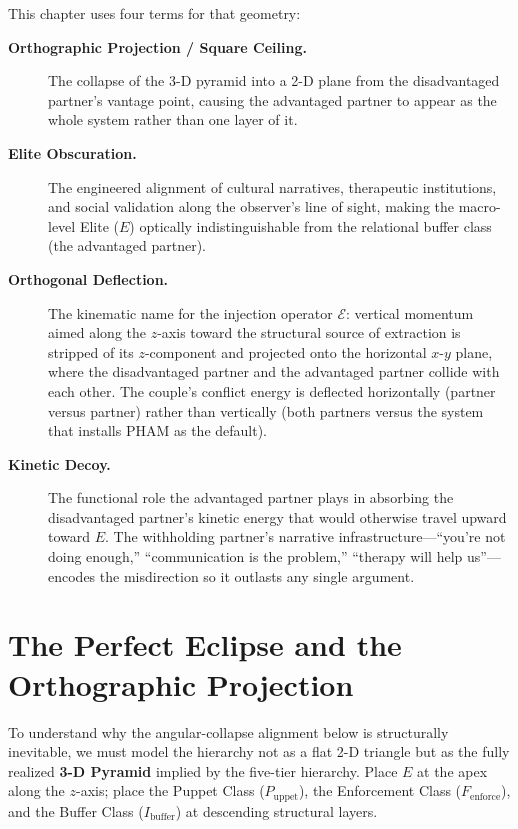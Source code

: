 \documentclass[12pt,openany]{book}
\numberwithin{equation}{chapter}
\begin{document}
This chapter uses four terms for that geometry:

\begin{description}
    \item[\textbf{Orthographic Projection / Square Ceiling.}] The collapse of
    the 3-D pyramid into a 2-D plane from the disadvantaged partner's vantage point, causing
    the advantaged partner to appear as the whole system rather than one layer of
    it.

    \item[\textbf{Elite Obscuration.}] The engineered alignment of
    cultural narratives, therapeutic institutions, and social validation along the
    observer's line of sight, making the macro-level Elite ($E$) optically indistinguishable from the
    relational buffer class (the advantaged partner).

    \item[\textbf{Orthogonal Deflection.}] The kinematic name for the injection
    operator $\mathcal{E}$: vertical momentum aimed along the $z$-axis
    toward the structural source of extraction is stripped of its $z$-component and projected onto the horizontal
    $x$-$y$ plane, where the disadvantaged partner and the advantaged partner collide with each other.
    The couple's conflict energy is deflected horizontally (partner versus partner) rather than
    vertically (both partners versus the system that installs PHAM as the default).

    \item[\textbf{Kinetic Decoy.}] The functional role
    the advantaged partner plays in absorbing the disadvantaged partner's kinetic energy that would
    otherwise travel upward toward $E$. The withholding partner's narrative infrastructure---``you're not
    doing enough,'' ``communication is the problem,'' ``therapy will help us''---encodes the misdirection
    so it outlasts any single argument.
\end{description}

\section{The Perfect Eclipse and the Orthographic Projection}
\label{sec:perfect_eclipse}

To understand why the angular-collapse alignment below is structurally inevitable,
we must model the hierarchy not as a flat 2-D triangle but as the fully realized
\textbf{3-D Pyramid} implied by the five-tier hierarchy.
Place $E$ at the apex along the $z$-axis; place the Puppet Class ($P_{\text{uppet}}$), the Enforcement Class ($F_{\text{enforce}}$),
and the Buffer Class ($I_{\text{buffer}}$) at descending structural layers.
\end{document}
